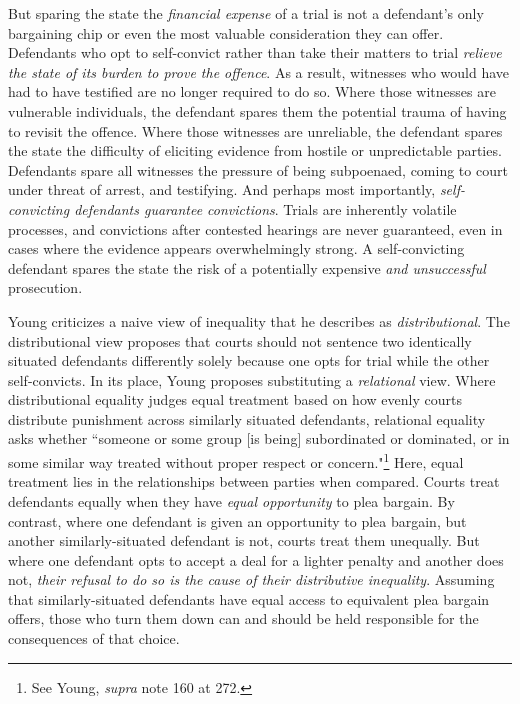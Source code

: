 But sparing the state the \textit{financial expense} of a trial is not a defendant's only bargaining chip or even the most valuable consideration they can offer. Defendants who opt to self-convict rather than take their matters to trial \textit{relieve the state of its burden to prove the offence}. As a result, witnesses who would have had to have testified are no longer required to do so. Where those witnesses are vulnerable individuals, the defendant spares them the potential trauma of having to revisit the offence. Where those witnesses are unreliable, the defendant spares the state the difficulty of eliciting evidence from hostile or unpredictable parties. Defendants spare all witnesses the pressure of being subpoenaed, coming to court under threat of arrest, and testifying. And perhaps most importantly, \textit{self-convicting defendants guarantee convictions}. Trials are inherently volatile processes, and convictions after contested hearings are never guaranteed, even in cases where the evidence appears overwhelmingly strong. A self-convicting defendant spares the state the risk of a potentially expensive \textit{and unsuccessful} prosecution.

Young criticizes a naive view of inequality that he describes as \textit{distributional}. The distributional view proposes that courts should not sentence two identically situated defendants differently solely because one opts for trial while the other self-convicts. In its place, Young proposes substituting a \textit{relational} view. Where distributional equality judges equal treatment based on how evenly courts distribute punishment across similarly situated defendants, relational equality asks whether ``someone or some group [is being] subordinated or dominated, or in some similar way treated without proper respect or concern."\footnote{See Young, \textit{supra} note 160 at 272.} Here, equal treatment lies in the relationships between parties when compared. Courts treat defendants equally when they have \textit{equal opportunity} to plea bargain. By contrast, where one defendant is given an opportunity to plea bargain, but another similarly-situated defendant is not, courts treat them unequally. But where one defendant opts to accept a deal for a lighter penalty and another does not, \textit{their refusal to do so is the cause of their distributive inequality}. Assuming that similarly-situated defendants have equal access to equivalent plea bargain offers, those who turn them down can and should be held responsible for the consequences of that choice.

